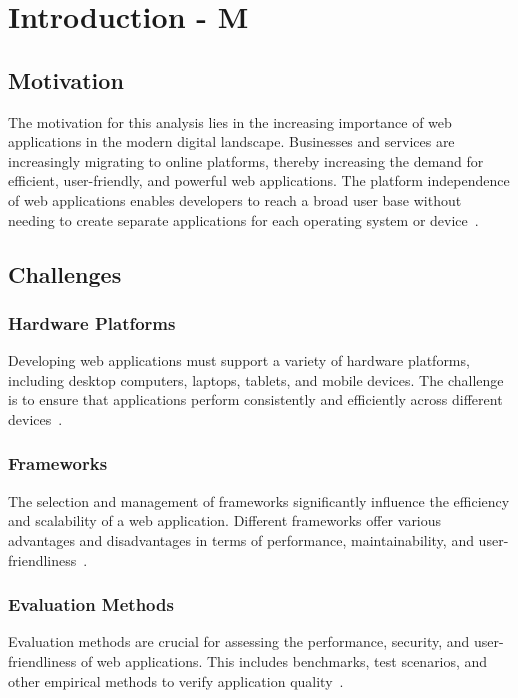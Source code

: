 \chapter{Introduction - M}
\label{cha:Introduction}


\section{Motivation}
The motivation for this analysis lies in the increasing importance of web applications in the modern digital landscape. 
Businesses and services are increasingly migrating to online platforms, thereby increasing the demand for efficient, user-friendly, and powerful web applications. 
The platform independence of web applications enables developers to reach a broad user base without needing to create separate applications for each operating system or device~\cite{unctad}.

\section{Challenges}

\subsection{Hardware Platforms}
Developing web applications must support a variety of hardware platforms, including desktop computers, laptops, tablets, and mobile devices. 
The challenge is to ensure that applications perform consistently and efficiently across different devices~\cite{mao2014developing}.

\subsection{Frameworks}
The selection and management of frameworks significantly influence the efficiency and scalability of a web application. 
Different frameworks offer various advantages and disadvantages in terms of performance, maintainability, and user-friendliness~\cite{verma2022comparison}.

\subsection{Evaluation Methods}
Evaluation methods are crucial for assessing the performance, security, and user-friendliness of web applications. 
This includes benchmarks, test scenarios, and other empirical methods to verify application quality~\cite{verma2022comparison}.

